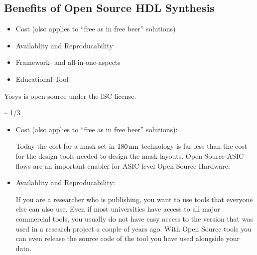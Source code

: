 
\subsection{Benefits of Open Source HDL Synthesis}

\begin{frame}{\subsecname}
\begin{itemize}
\item Cost (also applies to ``free as in free beer'' solutions)
\item Availablity and Reproducability
\item Framework- and all-in-one-aspects
\item Educational Tool
\end{itemize}

\bigskip

Yosys is open source under the ISC license.
\end{frame}

\begin{frame}{\subsecname{} -- 1/3}
\begin{itemize}
\item Cost (also applies to ``free as in free beer'' solutions): \smallskip\par
Today the cost for a mask set in $\unit[180]{nm}$ technology is far less than
the cost for the design tools needed to design the mask layouts. Open Source
ASIC flows are an important enabler for ASIC-level Open Source Hardware.

\bigskip
\item Availablity and Reproducability: \smallskip\par
If you are a researcher who is publishing, you want to use tools that everyone
else can also use. Even if most universities have access to all major
commercial tools, you usually do not have easy access to the version that was
used in a research project a couple of years ago. With Open Source tools you
can even release the source code of the tool you have used alongside your data.
\end{itemize}
\end{frame}

